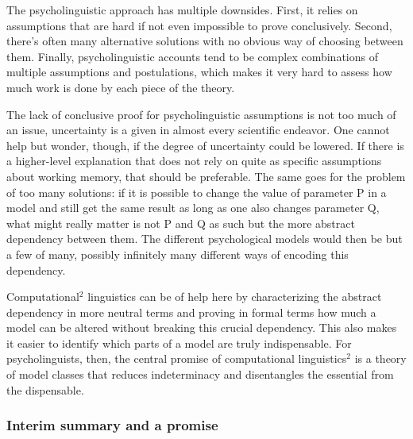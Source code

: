 The psycholinguistic approach has multiple downsides.
First, it relies on assumptions that are hard if not even impossible to prove conclusively.
Second, there's often many alternative solutions with no obvious way of choosing between them.
Finally, psycholinguistic accounts tend to be complex combinations of multiple assumptions and postulations, which makes it very hard to assess how much work is done by each piece of the theory.

The lack of conclusive proof for psycholinguistic assumptions is not too much of an issue, uncertainty is a given in almost every scientific endeavor.
One cannot help but wonder, though, if the degree of uncertainty could be lowered.
If there is a higher-level explanation that does not rely on quite as specific assumptions about working memory, that should be preferable.
The same goes for the problem of too many solutions: if it is possible to change the value of parameter P in a model and still get the same result as long as one also changes parameter Q, what might really matter is not P and Q as such but the more abstract dependency between them.
The different psychological models would then be but a few of many, possibly infinitely many different ways of encoding this dependency.

Computational$^2$ linguistics can be of help here by characterizing the abstract dependency in more neutral terms and proving in formal terms how much a model can be altered without breaking this crucial dependency.
This also makes it easier to identify which parts of a model are truly indispensable.
For psycholinguists, then, the central promise of computational linguistics$^2$ is a theory of model classes that reduces indeterminacy and disentangles the essential from the dispensable.


\subsubsection{Interim summary and a promise}

